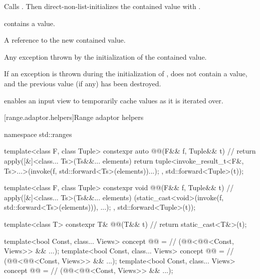 \begin{itemize}
\begin{itemdescr}
 \effects
Calls .
Then direct-non-list-initializes the contained value with .

 \ensures
{} contains a value.

 \returns
A reference to the new contained value.

 \throws
Any exception thrown by the initialization of the contained value.

 \remarks
If an exception is thrown during the initialization of ,
 does not contain a value, and
the previous value (if any) has been destroyed.
\end{itemdescr}
\end{itemize}

\pnum
\begin{note}
 enables an input view
to temporarily cache values as it is iterated over.
\end{note}

[range.adaptor.helpers]{Range adaptor helpers}

\begin{codeblock}
namespace std::ranges {
  template<class F, class Tuple>
  constexpr auto @@(F&& f, Tuple&& t) { // \expos
    return apply([&]<class... Ts>(Ts&&... elements) {
      return tuple<invoke_result_t<F&, Ts>...>(invoke(f, std::forward<Ts>(elements))...);
    }, std::forward<Tuple>(t));
  }

  template<class F, class Tuple>
  constexpr void @@(F&& f, Tuple&& t) { // \expos
    apply([&]<class... Ts>(Ts&&... elements) {
      (static_cast<void>(invoke(f, std::forward<Ts>(elements))), ...);
    }, std::forward<Tuple>(t));
  }

  template<class T>
  constexpr T& @@(T&& t) {                   // \expos
    return static_cast<T&>(t);
  }

  template<bool Const, class... Views>
    concept @@ =                     // \expos
      (@@<@@<Const, Views>> && ...);
  template<bool Const, class... Views>
    concept @@ =                     // \expos
      (@@<@@<Const, Views>> && ...);
  template<bool Const, class... Views>
    concept @@ =                           // \expos
      (@@<@@<Const, Views>> && ...);

}
\end{codeblock}

